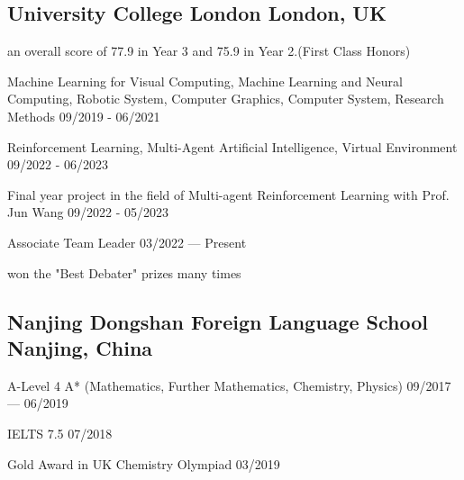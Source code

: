 
\subsection{
    University College London 
    \hfill London, UK
}
    \begin{zitemize}
        \item   an overall score of 77.9 in Year 3 and 75.9 in Year 2.(First Class Honors)
        \item   Machine Learning for Visual Computing, 
                Machine Learning and Neural Computing, 
                Robotic System, 
                Computer Graphics, 
                Computer System,
                Research Methods 
                \hfill 09/2019 - 06/2021
        \item   Reinforcement Learning,    
                Multi-Agent Artificial Intelligence,
                Virtual Environment 
                \hfill 09/2022 - 06/2023
        \item   Final year project in the field of Multi-agent Reinforcement Learning
                with Prof. Jun Wang
                \hfill 09/2022 - 05/2023
    \end{zitemize}

    \begin{zitemize}
        \item   Associate Team Leader 
                \hfill 03/2022 --- Present
        \item   won the "Best Debater" prizes many times
    \end{zitemize}


\vspace{0.3em}


\subsection{
    Nanjing Dongshan Foreign Language School 
    \hfill Nanjing, China
}
    \begin{zitemize}
        \item   A-Level 4 A* (Mathematics, Further Mathematics, Chemistry, Physics) 
                \hfill 09/2017 --- 06/2019 
        \item   IELTS 7.5 
                \hfill 07/2018 
        \item   Gold Award in UK Chemistry Olympiad
                \hfill 03/2019
    \end{zitemize}


